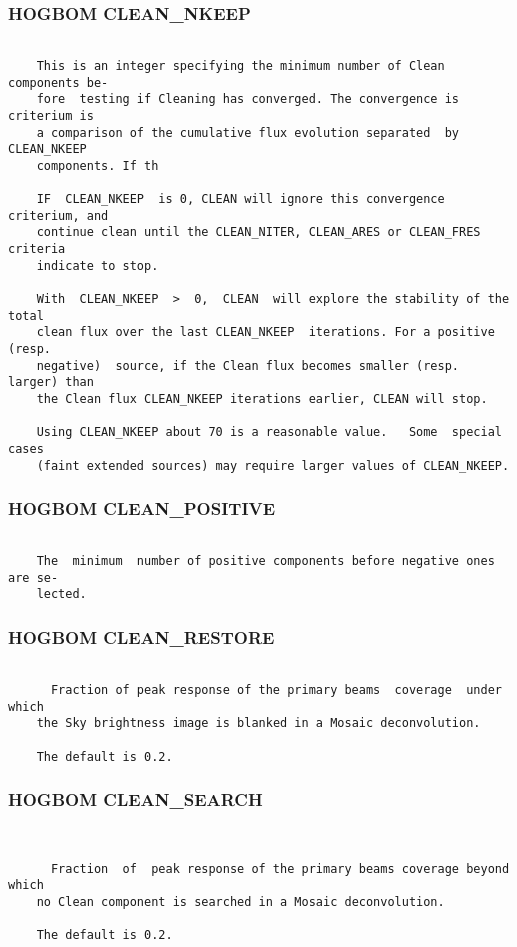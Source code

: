 \subsubsection{HOGBOM CLEAN\_NKEEP}
\begin{verbatim}

    This is an integer specifying the minimum number of Clean components be-
    fore  testing if Cleaning has converged. The convergence is criterium is
    a comparison of the cumulative flux evolution separated  by  CLEAN_NKEEP
    components. If th

    IF  CLEAN_NKEEP  is 0, CLEAN will ignore this convergence criterium, and
    continue clean until the CLEAN_NITER, CLEAN_ARES or CLEAN_FRES  criteria
    indicate to stop.

    With  CLEAN_NKEEP  >  0,  CLEAN  will explore the stability of the total
    clean flux over the last CLEAN_NKEEP  iterations. For a positive  (resp.
    negative)  source, if the Clean flux becomes smaller (resp. larger) than
    the Clean flux CLEAN_NKEEP iterations earlier, CLEAN will stop.

    Using CLEAN_NKEEP about 70 is a reasonable value.   Some  special  cases
    (faint extended sources) may require larger values of CLEAN_NKEEP.

\end{verbatim}
\subsubsection{HOGBOM CLEAN\_POSITIVE}
\begin{verbatim}

    The  minimum  number of positive components before negative ones are se-
    lected.

\end{verbatim}
\subsubsection{HOGBOM CLEAN\_RESTORE}
\begin{verbatim}

      Fraction of peak response of the primary beams  coverage  under  which
    the Sky brightness image is blanked in a Mosaic deconvolution.

    The default is 0.2.

\end{verbatim}
\subsubsection{HOGBOM CLEAN\_SEARCH}
\begin{verbatim}


      Fraction  of  peak response of the primary beams coverage beyond which
    no Clean component is searched in a Mosaic deconvolution.

    The default is 0.2.

\end{verbatim}

